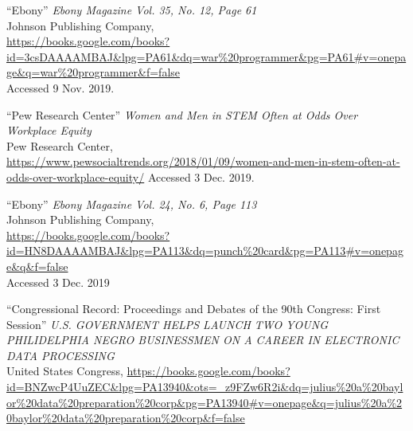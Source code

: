 \documentclass[a4paper,12pt]{article}
\begin{document}
\begin{thebibliography}{9}

``Ebony'' \textit{Ebony Magazine Vol. 35, No. 12, Page 61}\\
Johnson Publishing Company, \\
\url{https://books.google.com/books?id=3csDAAAAMBAJ&lpg=PA61&dq=war%20programmer&pg=PA61#v=onepage&q=war%20programmer&f=false}  \\
Accessed 9 Nov. 2019.

``Pew Research Center'' \textit{Women and Men in STEM Often at Odds Over Workplace Equity} \\
Pew Research Center,\\
\url{https://www.pewsocialtrends.org/2018/01/09/women-and-men-in-stem-often-at-odds-over-workplace-equity/}
Accessed 3 Dec. 2019.

``Ebony''
\textit{Ebony Magazine Vol. 24, No. 6, Page 113} \\
Johnson Publishing Company, \\
\url{https://books.google.com/books?id=HN8DAAAAMBAJ&lpg=PA113&dq=punch%20card&pg=PA113#v=onepage&q&f=false} \\
Accessed 3 Dec. 2019

``Congressional Record: Proceedings and Debates of the 90th Congress: First Session''
\textit{U.S. GOVERNMENT HELPS LAUNCH TWO YOUNG PHILIDELPHIA NEGRO BUSINESSMEN ON A CAREER IN ELECTRONIC DATA PROCESSING} \\
United States Congress,
\url{https://books.google.com/books?id=BNZwcP4UuZEC&lpg=PA13940&ots=_z9FZw6R2i&dq=julius%20a%20baylor%20data%20preparation%20corp&pg=PA13940#v=onepage&q=julius%20a%20baylor%20data%20preparation%20corp&f=false} %

\end{thebibliography}

\newpage

\end{document}
